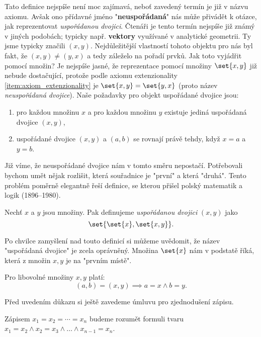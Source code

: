 Tato definice nejspíše není moc zajímavá, neboť zavedený termín je již v názvu axiomu. Avšak ono přídavné jméno "\textbf{neuspořádaná}" nás může přivádět k otázce, jak reprezentovat \emph{uspořádanou dvojici}. Čtenáři je tento termín nejspíše již známý v jiných podobách; typicky např. \textbf{vektory} využívané v analytické geometrii. Ty jsme typicky značili $(x,y)$. Nejdůležitější vlastností tohoto objektu pro nás byl fakt, že $(x,y)\neq (y,x)$ a tedy záleželo na pořadí prvků. Jak toto vyjádřit pomocí množin? Je nejspíše jasné, že reprezentace pomocí množiny $\set{x,y}$ již nebude dostačující, protože podle axiomu extenzionality \ref{item:axiom_extenzionality} je $\set{x,y}=\set{y,x}$ (proto název \emph{neuspořádaná dvojice}). Naše požadavky pro objekt uspořádané dvojice jsou:
\begin{enumerate}
    \item pro každou množinu $x$ a pro každou množinu $y$ existuje jediná uspořádaná dvojice $(x,y)$,
    \item uspořádané dvojice $(x,y)$ a $(a,b)$ se rovnají právě tehdy, když $x=a$ a $y=b$.
\end{enumerate}
Již víme, že neuspořádané dvojice nám v tomto směru nepostačí. Potřebovali bychom umět nějak rozlišit, která souřadnice je "první" a která "druhá". Tento problém poměrně elegantně řeší definice, se kterou přišel polský matematik a logik  (1896--1980).
\begin{definition}\label{def:usporadana_dvojice}
    Nechť $x$ a $y$ jsou množiny. Pak definujeme \emph{uspořádanou dvojici} $(x,y)$ jako
    \begin{equation*}
        \set{\set{x},\set{x,y}}.
    \end{equation*}
\end{definition}
Po chvilce zamyšlení nad touto definicí si můžeme uvědomit, že název "uspořádaná dvojice" je zcela oprávněný. Množina $\set{x}$ nám v podstatě  říká, která z množin $x,y$ je na "prvním místě".
\begin{lemma}\label{lem:vlastnost_usp_dvojic}
    Pro libovolné množiny $x,y$ platí:
    \begin{equation*}
        (a,b)=(x,y) \implies a=x \land b=y.
    \end{equation*}
\end{lemma}
Před uvedením důkazu si ještě zavedeme úmluvu pro zjednodušení zápisu.
\begin{convention}
    Zápisem $x_1=x_2=\cdots=x_n$ budeme rozumět formuli tvaru $x_1=x_2 \land x_2=x_3 \land \dots \land x_{n-1}=x_n$.
\end{convention}
